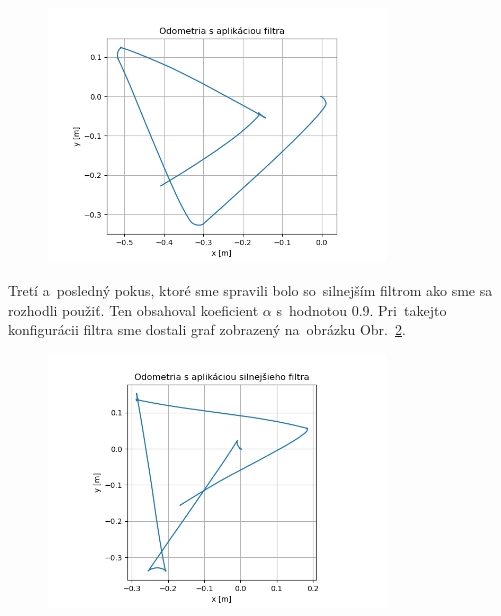 \begin{figure}[!htbp]
	\begin{center}
		\includegraphics[width=0.8\textwidth]{img/stvorec_s_filtrom.png}
	\end{center}
	\caption{}
	\label{fig:stvorecSFiltrom}
\end{figure}

Tretí a~posledný pokus, ktoré sme spravili bolo so~silnejším filtrom ako sme sa rozhodli použiť. Ten obsahoval
koeficient $\alpha$ s~hodnotou 0.9. Pri~takejto konfigurácii filtra sme dostali graf zobrazený na~obrázku
Obr.~\ref{fig:stvorecSoSilnymFiltrom}. 

\begin{figure}[!htbp]
	\begin{center}
		\includegraphics[width=0.8\textwidth]{img/stvorec_so_silnym_filtrom.png}
	\end{center}
	\caption{}
	\label{fig:stvorecSoSilnymFiltrom}
\end{figure}

